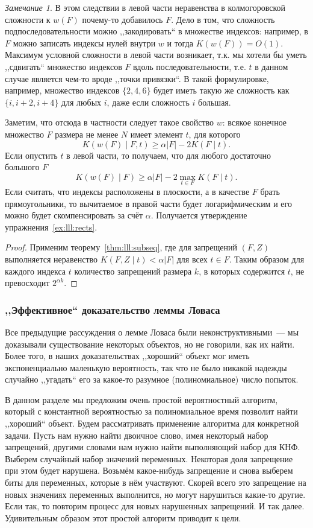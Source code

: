 \documentclass[12pt]{article}
\theoremstyle{definition}
\theoremstyle{plain}
\theoremstyle{remark}
\newtheorem{remark}{Замечание}[section]
\begin{document}
\begin{remark}
В этом следствии в левой части неравенства в колмогоровской сложности к $w(F)$ 
почему-то добавилось $F$. Дело в том, что сложность подпоследовательности 
можно ,,закодировать`` в множестве индексов: например, в $F$ можно записать 
индексы нулей внутри $w$ и тогда $K(w(F)) = O(1)$. Максимум условной сложности 
в левой части возникает, т.к. мы хотели бы уметь ,,сдвигать`` множество индексов $F$
вдоль последовательности, т.е. $t$ в данном случае является чем-то вроде ,,точки привязки``.
В такой формулировке, например, множество индексов $\{2,4,6\}$ будет 
иметь такую же сложность как $\{i, i+2, i+4\}$ для любых $i$, даже если сложность $i$ большая.
\end{remark}

Заметим, что отсюда в частности следует такое свойство $w$: всякое конечное множество $F$
размера не менее $N$ имеет элемент $t$, для которого
\[
    K(w(F) \mid F, t) \ge \alpha |F| - 2K(F\mid t).
\]
Если опустить $t$ в левой части, то получаем, что для любого достаточно большого $F$
\[
K(w(F) \mid F) \ge \alpha |F| - 2\max_{t\in F} K(F\mid t).
\]
Если считать, что индексы расположены в плоскости, а в качестве $F$ брать прямоугольники,
то вычитаемое в правой части будет логарифмическим и его можно будет скомпенсировать за
счёт $\alpha$. Получается утверждение упражнения~\ref{ex:lll:rects}.
\begin{proof}
    Применим теорему~\ref{thm:lll:subseq}, где для запрещений $(F,Z)$ выполняется
    неравенство $K(F,Z\mid t) < \alpha|F|$ для всех $t\in F$. Таким образом для
    каждого индекса $t$ количество запрещений размера $k$, в которых содержится $t$,
    не превосходит $2^{\alpha k}$.
\end{proof}

\subsubsection{,,Эффективное`` доказательство леммы Ловаса}
Все предыдущие рассуждения о лемме Ловаса были неконструктивными~--- мы доказывали
существование некоторых объектов, но не говорили, как их найти. Более того,
в наших доказательствах ,,хороший`` объект мог иметь экспоненциально маленькую
вероятность, так что не было никакой надежды случайно ,,угадать`` его за 
какое-то разумное (полиномиальное) число попыток.

В данном разделе мы предложим очень простой вероятностный алгоритм, 
который с константной вероятностью за полиномиальное время позволит найти
,,хороший`` объект. Будем рассматривать применение алгоритма для
конкретной задачи. Пусть нам нужно найти двоичное слово, имея
некоторый набор запрещений, другими словами нам нужно найти
выполняющий набор для КНФ. Выберем случайный набор значений переменных. Некоторая
доля запрещение при этом будет нарушена. Возьмём какое-нибудь
запрещение и снова выберем биты для переменных, которые в нём участвуют.
Скорей всего это запрещение на новых значениях переменных выполнится,
но могут нарушиться какие-то другие. Если так, то повторим процесс
для новых нарушенных запрещений. И так далее. Удивительным образом
этот простой алгоритм приводит к цели.
\end{document}
